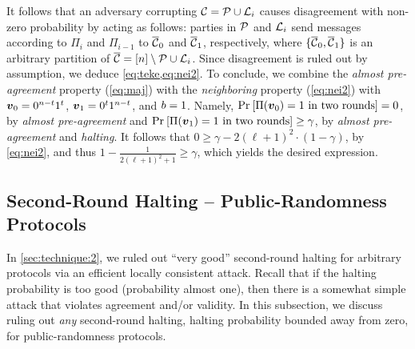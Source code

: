 It follows that an adversary corrupting $\mathcal{C}=\mathcal{P} \cup {\cal{L}}_i$ causes disagreement with non-zero probability by acting as follows: parties in $\mathcal{P}$ and ${\cal{L}}_i$ send messages according to $\Pi_i$ and $\Pi_{i-1}$ to $\overline{\mathcal{C}}_0$ and $\overline{\mathcal{C}}_1$, respectively, where $\{\overline{\mathcal{C}}_0,\overline{\mathcal{C}}_1\}$ is an arbitrary partition of $\overline{\mathcal{C}}= [n]\setminus \mathcal{P}\cup {\cal{L}}_i$. Since disagreement is ruled out by assumption, we deduce \cref{eq:teke,eq:nei2}. To conclude, we combine the \emph{almost pre-agreement}
property (\cref{eq:maj}) with the \emph{neighboring} property (\cref{eq:nei2}) with
${ \boldsymbol{v}}_0=0^{n-t}1^{t}$, ${ \boldsymbol{v}}_1=0^{t}1^{n-t}$, and $b=1$.
Namely, $\Pr_{}\left[\Pi({ \boldsymbol{v}}_0)=1\text{ in two rounds}\right]=0$, by \emph{almost pre-agreement}
and $\Pr_{}\left[\Pi({ \boldsymbol{v}}_1)=1\text{ in two rounds}\right]\ge\gamma$, by \emph{almost pre-agreement}
and \emph{halting}. It follows that $0 \ge \gamma - 2 (\ell +1)^2 \cdot (1-\gamma)$, by \cref{eq:nei2}, and thus $1-\frac{1}{2(\ell+1)^2+1} \ge \gamma$, which yields the desired expression.



\subsection{Second-Round Halting -- Public-Randomness Protocols}\label{sec:technique:3}

In \cref{sec:technique:2}, we ruled out ``very good'' second-round halting for arbitrary protocols via an efficient locally consistent attack. Recall that if the halting probability is too good (probability almost one), then there is a somewhat simple attack that violates agreement and/or validity. In this subsection, we discuss ruling out \emph{any} second-round halting, \ie halting probability bounded away from zero, for public-randomness protocols.

